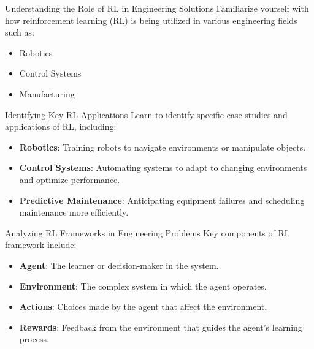 \documentclass[aspectratio=169]{beamer}
\begin{document}
\begin{frame}[fragile]{Understanding the Role of RL in Engineering Solutions}
    Familiarize yourself with how reinforcement learning (RL) is being utilized in various engineering fields such as:
    \begin{itemize}
        \item Robotics
        \item Control Systems
        \item Manufacturing
    \end{itemize}
\end{frame}

\begin{frame}[fragile]{Identifying Key RL Applications}
    Learn to identify specific case studies and applications of RL, including:
    \begin{itemize}
        \item \textbf{Robotics}: Training robots to navigate environments or manipulate objects.
        \item \textbf{Control Systems}: Automating systems to adapt to changing environments and optimize performance.
        \item \textbf{Predictive Maintenance}: Anticipating equipment failures and scheduling maintenance more efficiently.
    \end{itemize}
\end{frame}

\begin{frame}[fragile]{Analyzing RL Frameworks in Engineering Problems}
    Key components of RL framework include:
    \begin{itemize}
        \item \textbf{Agent}: The learner or decision-maker in the system.
        \item \textbf{Environment}: The complex system in which the agent operates.
        \item \textbf{Actions}: Choices made by the agent that affect the environment.
        \item \textbf{Rewards}: Feedback from the environment that guides the agent's learning process.
    \end{itemize}
\end{frame}
\end{document}
